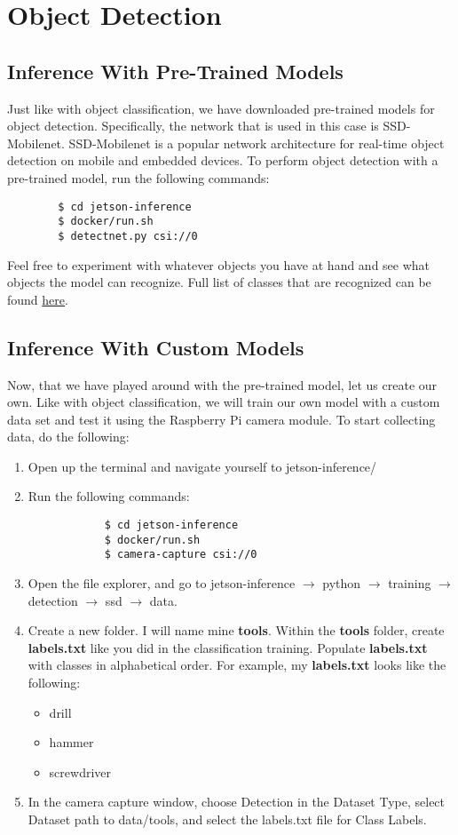 \documentclass[letter, 12pt]{article}
\begin{document}
	\section{Object Detection}
	\subsection{Inference With Pre-Trained Models}
	\noindent Just like with object classification, we have downloaded pre-trained models for object detection. Specifically, the network that is used in this case is SSD-Mobilenet. SSD-Mobilenet is a popular network architecture for real-time object detection on mobile and embedded devices. To perform object detection with a pre-trained model, run the following commands:
	\begin{verbatim}
		$ cd jetson-inference
		$ docker/run.sh
		$ detectnet.py csi://0
	\end{verbatim}
	\noindent Feel free to experiment with whatever objects you have at hand and see what objects the model can recognize. Full list of classes that are recognized can be found \href{https://github.com/dusty-nv/pytorch-ssd/blob/master/open_images_classes.txt}{here}.

	\subsection{Inference With Custom Models}
	\noindent Now, that we have played around with the pre-trained model, let us create our own. Like with object classification, we will train our own model with a custom data set and test it using the Raspberry Pi camera module. To start collecting data, do the following:
	\begin{enumerate}
		\item Open up the terminal and navigate yourself to jetson-inference/ 
		\item Run the following commands:
		\begin{verbatim}
			$ cd jetson-inference
			$ docker/run.sh
			$ camera-capture csi://0
		\end{verbatim}
		\item Open the file explorer, and go to jetson-inference $\rightarrow$ python $\rightarrow$ training $\rightarrow$ detection $\rightarrow$ ssd $\rightarrow$ data.
		\item Create a new folder. I will name mine \textbf{tools}. Within the \textbf{tools} folder, create \textbf{labels.txt} like you did in the classification training. Populate \textbf{labels.txt} with classes in alphabetical order. For example, my \textbf{labels.txt} looks like the following:
		\begin{itemize}[label={}]
			\item drill
			\item hammer
			\item screwdriver
		\end{itemize}
		\item In the camera capture window, choose Detection in the Dataset Type, select Dataset path to data/tools, and select the labels.txt file for Class Labels.  
	\end{enumerate}
	
\end{document}
